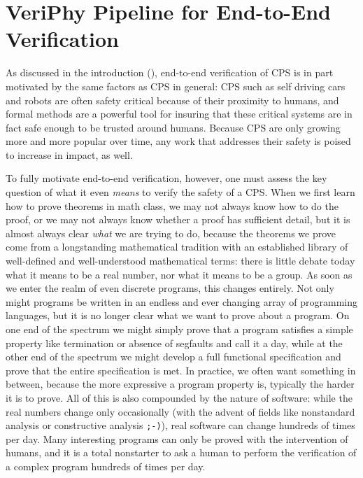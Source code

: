 \documentclass[12pt]{cmuthesis}
\theoremstyle{definition}
\theoremstyle{remark}
\newcommand{\rref}[2][]{\prettyref{#2}}
\newcommand{\VeriPhy}{VeriPhy\xspace}
\begin{document}
\section{\VeriPhy Pipeline for End-to-End Verification}
\label{sec:veriphy}
As discussed in the introduction (\rref{ch:introduction}), end-to-end verification of CPS is in part motivated by the same factors as CPS in general: CPS such as self driving cars and robots are often safety critical because of their proximity to humans, and formal methods are a powerful tool for insuring that these critical systems are in fact safe enough to be trusted around humans. Because CPS are only growing more and more popular over time, any work that addresses their safety is poised to increase in impact, as well.

To fully motivate end-to-end verification, however, one must assess the key question of what it even \emph{means} to verify the safety of a CPS.
When we first learn how to prove theorems in math class, we may not always know how to do the proof, or we may not always know whether a proof has sufficient detail, but it is almost always clear \emph{what} we are trying to do, because the theorems we prove come from a longstanding mathematical tradition with an established library of well-defined and well-understood mathematical terms: there is little debate today what it means to be a real number, nor what it means to be a group.
As soon as we enter the realm of even discrete programs, this changes entirely. Not only might programs be written in an endless and ever changing array of programming languages, but it is no longer clear what we want to prove about a program. On one end of the spectrum we might simply prove that a program satisfies a simple property like termination or absence of segfaults and call it a day, while at the other end of the spectrum we might develop a full functional specification and prove that the entire specification is met. In practice, we often want something in between, because the more expressive a program property is, typically the harder it is to prove. All of this is also compounded by the nature of software: while the real numbers change only occasionally (with the advent of fields like nonstandard analysis or constructive analysis \texttt{;-)}), real software can change hundreds of times per day. Many interesting programs can only be proved with the intervention of humans, and it is a total nonstarter to ask a human to perform the verification of a complex program hundreds of times per day.
\end{document}
